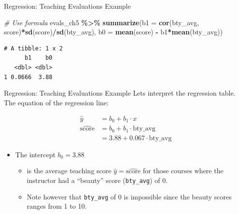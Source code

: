 \documentclass[
  ignorenonframetext,
]{beamer}
\newenvironment{Shaded}{\begin{snugshade}}{\end{snugshade}}
\newcommand{\AttributeTok}[1]{\textcolor[rgb]{0.13,0.29,0.53}{#1}}
\newcommand{\CommentTok}[1]{\textcolor[rgb]{0.56,0.35,0.01}{\textit{#1}}}
\newcommand{\FunctionTok}[1]{\textcolor[rgb]{0.13,0.29,0.53}{\textbf{#1}}}
\newcommand{\NormalTok}[1]{#1}
\newcommand{\SpecialCharTok}[1]{\textcolor[rgb]{0.81,0.36,0.00}{\textbf{#1}}}
\providecommand{\tightlist}{%
  \setlength{\itemsep}{0pt}\setlength{\parskip}{0pt}}
\begin{document}
\begin{frame}[fragile]{Regression: Teaching Evaluations Example}
\protect\hypertarget{regression-teaching-evaluations-example-4}{}
\small

\begin{Shaded}
\begin{Highlighting}[]
\CommentTok{\# Use formula}
\NormalTok{evals\_ch5 }\SpecialCharTok{\%\textgreater{}\%} 
  \FunctionTok{summarize}\NormalTok{(}\AttributeTok{b1 =} \FunctionTok{cor}\NormalTok{(bty\_avg, score)}\SpecialCharTok{*}\FunctionTok{sd}\NormalTok{(score)}\SpecialCharTok{/}\FunctionTok{sd}\NormalTok{(bty\_avg),}
            \AttributeTok{b0 =} \FunctionTok{mean}\NormalTok{(score) }\SpecialCharTok{{-}}\NormalTok{ b1}\SpecialCharTok{*}\FunctionTok{mean}\NormalTok{(bty\_avg))}
\end{Highlighting}
\end{Shaded}

\begin{verbatim}
# A tibble: 1 x 2
      b1    b0
   <dbl> <dbl>
1 0.0666  3.88
\end{verbatim}
\end{frame}

\begin{frame}[fragile]{Regression: Teaching Evaluations Example}
\protect\hypertarget{regression-teaching-evaluations-example-5}{}
Lets interpret the regression table. The equation of the regression
line:

\[
\begin{aligned}
\hat{y} &= b_0 +b_1\cdot x \\
\widehat{\text{score}} &= b_0 + b_1\cdot{\text{bty\_avg}}\\
&= 3.88 + 0.067\cdot\text{bty\_avg}
\end{aligned}
\]

\begin{itemize}
\item
  The intercept \(b_0 = 3.88\)

  \begin{itemize}
  \tightlist
  \item
    is the average teaching score \(\hat{y}=\widehat{\text{score}}\) for
    those courses where the instructor had a ``beauty'' score
    (\texttt{bty\_avg}) of 0.
  \item
    Note however that \texttt{bty\_avg} of 0 is impossible since the
    beauty scores ranges from 1 to 10.
  \end{itemize}
\end{itemize}
\end{frame}
\end{document}
